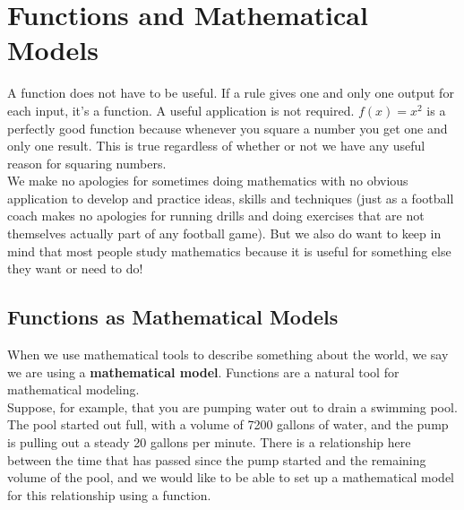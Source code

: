 %
%

\section{Functions and Mathematical Models}

A function does not have to be useful. If a rule gives one and only one output for each input, it’s a function. A useful application is not required. $f(x)=x^2$ is a perfectly good function because whenever you square a number you get one and only one result. This is true regardless of whether or not we have any useful reason for squaring numbers.\\

We make no apologies for sometimes doing mathematics with no obvious application to develop and practice ideas, skills and techniques (just as a football coach makes no apologies for running drills and doing exercises that are not themselves actually part of any football game). But we also do want to keep in mind that most people study mathematics because it is useful for something else they want or need to do!

%
%

\subsection{Functions as Mathematical Models}

When we use mathematical tools to describe something about the world, we say we are using a \textbf{mathematical model}. Functions are a natural tool for mathematical modeling.\\

Suppose, for example, that you are pumping water out to drain a swimming pool. The pool started out full, with a volume of 7200 gallons of water, and the pump is pulling out a steady 20 gallons per minute. There is a relationship here between the time that has passed since the pump started and the remaining volume of the pool, and we would like to be able to set up a mathematical model for this relationship using a function.\\

